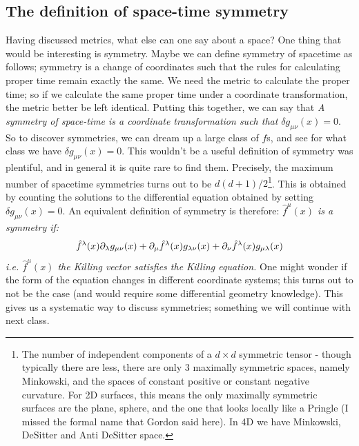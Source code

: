 \subsection{The definition of space-time symmetry}
Having discussed metrics, what else can one say about a space? One thing that would be interesting is symmetry. Maybe we can define symmetry of spacetime as follows; symmetry is a change of coordinates such that the rules for calculating proper time remain exactly the same. We need the metric to calculate the proper time; so if we calculate the same proper time under a coordinate transformation, the metric better be left identical. Putting this together, we can say that \emph{A symmetry of space-time is a coordinate transformation such that $\delta g_{\mu\nu}(x) = 0$}. So to discover symmetries, we can dream up a large class of $f$s, and see for what class we have $\delta g_{\mu\nu}(x) = 0$. This wouldn't be a useful definition of symmetry was plentiful, and in general it is quite rare to find them. Precisely, the maximum number of spacetime symmetries turns out to be $d(d+1)/2$\footnote{The number of independent components of a $d\times d$ symmetric tensor - though typically there are less, there are only 3 maximally symmetric spaces, namely Minkowski, and the spaces of constant positive or constant negative curvature. For 2D surfaces, this means the only maximally symmetric surfaces are the plane, sphere, and the one that looks locally like a Pringle (I missed the formal name that Gordon said here). In 4D we have Minkowski, DeSitter and Anti DeSitter space.}. This is obtained by counting the solutions to the differential equation obtained by setting $\delta g_{\mu\nu}(x) = 0$. An equivalent definition of symmetry is therefore: \emph{$\hat{f}^\mu(x)$ is a symmetry if:
\begin{equation}
    \hat{f}^\lambda(x)\partial_\lambda g_{\mu\nu}(x) + \partial_\mu \hat{f}^\lambda(x) g_{\lambda \nu}(x) + \partial_\nu \hat{f}^\lambda(x) g_{\mu\lambda}(x)
\end{equation}
i.e. $\hat{f}^\mu(x)$ the Killing vector satisfies the Killing equation.} One might wonder if the form of the equation changes in different coordinate systems; this turns out to not be the case (and would require some differential geometry knowledge). This gives us a systematic way to discuss symmetries; something we will continue with next class.